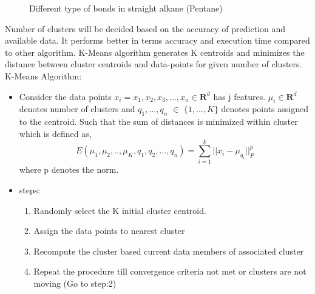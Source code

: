 \documentclass[preprint,12pt]{elsarticle}
\begin{document}
\begin{figure}[H]
					\caption{Different type of bonds in straight alkane (Pentane)}
					\label{fig:fuelbondtikz}
				\end{figure}
				Number of clusters will be decided based on the accuracy of prediction and available data. It performs better in terms accuracy and execution time compared to other algorithm\cite{clustering}. K-Means algorithm generates K centroids and minimizes the distance between cluster centroids and data-points for given number of clusters.\\
					
					K-Means Algorithm:
					\begin{itemize}
						\item Consider the data points $x_i= {x_1, x_2, x_3, ... , x_n} \in \mathbf {R}^d $  has j features. $\mu_i \in \mathbf {R}^d$ denotes number of clusters and $q_1, ... ,q_n$ $\in$ $\{1, ... , K\}$ denotes points assigned to the centroid. Such that the sum of distances 
						 is minimized within cluster which is defined as,
						\begin{equation}
 E (\mu_1, \mu_2,.., \mu_K, q_1, q_2, ... ,q_n) =  \sum_{i=1}^{k} ||x_i - \mu_{q_i} ||^p_P
						\end{equation}
						where p denotes the norm.
						\item {steps:} 
						\begin{enumerate}
							\item Randomly select the K initial cluster centroid.
							\item Assign the data points to nearest cluster 
							\item Recompute the  cluster based current data members of associated cluster
							\item Repeat the procedure till convergence criteria not met or clusters are not moving (Go to step:2) 
						\end{enumerate}
					\end{itemize} 
					
\end{document}

